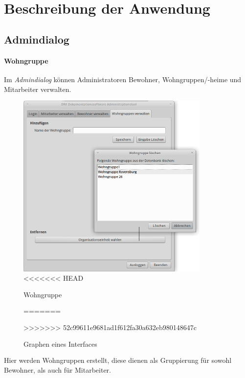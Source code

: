 \section{Beschreibung der Anwendung}
\label{sec:beschreibung}
\subsection{Admindialog}
\paragraph{Wohngruppe}
Im \textit{Admindialog} können Administratoren Bewohner, Wohngruppen/-heime und Mitarbeiter verwalten.
\begin{figure}[h]
	\begin{center}
		\includegraphics[keepaspectratio=true, width=0.85\textwidth]{pics/admin3.png}
<<<<<<< HEAD
		\caption{Wohngruppe}
		\label{Admindialog Wohngruppe}
=======
		\caption{Graphen eines Interfaces}
		\label{Admindialog_Mitarbeiter_erstellen}
>>>>>>> 52c99611e9681ad1f612fa30a632eb980148647c
	\end{center}
\end{figure}
\FloatBarrier
\noindent
Hier werden Wohngruppen erstellt, diese dienen als Gruppierung für sowohl Bewohner, als auch für Mitarbeiter.
\newpage
\noindent
